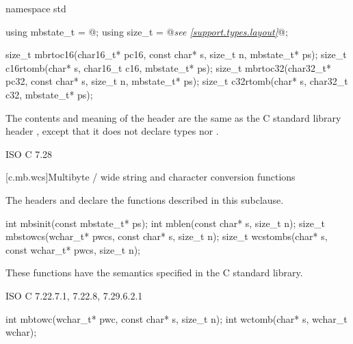 %
%
%
%
%
%
%
\begin{codeblock}
namespace std {
  using mbstate_t = @\seebelow@;
  using size_t = @\textit{see \ref{support.types.layout}}@;

  size_t mbrtoc16(char16_t* pc16, const char* s, size_t n, mbstate_t* ps);
  size_t c16rtomb(char* s, char16_t c16, mbstate_t* ps);
  size_t mbrtoc32(char32_t* pc32, const char* s, size_t n, mbstate_t* ps);
  size_t c32rtomb(char* s, char32_t c32, mbstate_t* ps);
}
\end{codeblock}

\pnum
{}%
The contents and meaning of the header 
are the same as the C standard library header
, except that it does not declare types  nor
.

\xref ISO C 7.28

[c.mb.wcs]{Multibyte / wide string and character conversion functions}

\pnum
{}%
%
\begin{note}
The headers 
and 
declare the functions described in this subclause.
\end{note}

%
%
%
%
\begin{itemdecl}
int mbsinit(const mbstate_t* ps);
int mblen(const char* s, size_t n);
size_t mbstowcs(wchar_t* pwcs, const char* s, size_t n);
size_t wcstombs(char* s, const wchar_t* pwcs, size_t n);
\end{itemdecl}

\begin{itemdescr}
\pnum
\effects
These functions have the semantics specified in the C standard library.
\end{itemdescr}

\xref ISO C 7.22.7.1, 7.22.8, 7.29.6.2.1

%
%
\begin{itemdecl}
int mbtowc(wchar_t* pwc, const char* s, size_t n);
int wctomb(char* s, wchar_t wchar);
\end{itemdecl}

